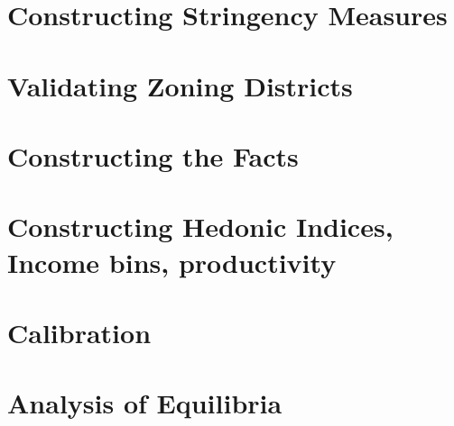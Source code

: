 \documentclass[]{article}
\begin{document}
\section{Constructing Stringency Measures}

\section{Validating Zoning Districts}

\section{Constructing the Facts}

\section{Constructing Hedonic Indices, Income bins, productivity}

\section{Calibration}

\section{Analysis of Equilibria}
\end{document}
